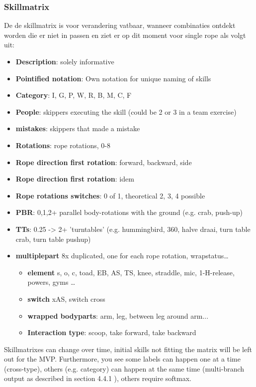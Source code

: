 \subsubsection{Skillmatrix}

De de skillmatrix is voor verandering vatbaar, wanneer combinaties ontdekt worden die er niet in passen en ziet er op dit moment voor single rope als volgt uit:

\begin{itemize}
    \item \textbf{Description}: solely informative
    \item \textbf{Pointified notation}: Own notation for unique naming of skills
    \item \textbf{Category}: I, G, P, W, R, B, M, C, F
    \item \textbf{People}: skippers executing the skill (could be 2 or 3 in a team exercise)
    \item \textbf{mistakes}: skippers that made a mistake
    \item \textbf{Rotations}: rope rotations, 0-8
    \item \textbf{Rope direction first rotation}: forward, backward, side
    \item \textbf{Rope direction first rotation}: idem
    \item \textbf{Rope rotations switches}: 0 of 1, theoretical 2, 3, 4 possible
    \item \textbf{PBR}: 0,1,2+ parallel body-rotations with the ground (e.g. crab, push-up)
    \item \textbf{TTs}: 0.25 -> 2+ 'turntables' (e.g. hummingbird, 360, halve draai, turn table crab, turn table pushup)
    \item \textbf{multiplepart} 8x duplicated, one for each rope rotation, wrapstatus\dots
    \begin{itemize}
        \item \textbf{element} s, o, c, toad, EB, AS, TS, knee, straddle, mic, 1-H-release, powers, gyms \dots
        \item \textbf{switch} xAS, switch cross
        \item \textbf{wrapped bodyparts}: arm, leg, between leg around arm...
        \item \textbf{Interaction type}: scoop, take forward, take backward
    \end{itemize}
\end{itemize}

    
Skillmatrixes can change over time, initial skills not fitting the matrix will be left out for the MVP.
Furthermore, you see some labels can happen one at a time (cross-type), others (e.g. category) can happen at the same time (multi-branch output as described in section 4.4.1 \autocite{Coulibaly_2022}), others require softmax.

